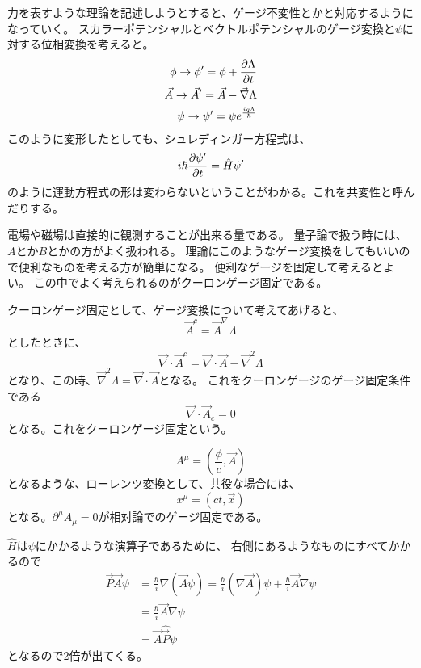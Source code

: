 \documentclass[titlepage]{ltjsarticle}
\begin{document}
力を表すような理論を記述しようとすると、ゲージ不変性とかと対応するようになっていく。
スカラーポテンシャルとベクトルポテンシャルのゲージ変換と\(\psi\)に対する位相変換を考えると。
\begin{align}
  \phi \to  \phi' = \phi + \pdv{\Lambda}{t}\\
  \vec{A} \to \vec{A}' = \vec{A} - \vec{\nabla} \Lambda\\
  \psi \to \psi' = \psi e^{\frac{i q \Lambda}{\hbar}}
\end{align}
このように変形したとしても、シュレディンガー方程式は、
\begin{equation}
  i \hbar \pdv{\psi'}{t} = \hat{H} \psi'
\end{equation}
のように運動方程式の形は変わらないということがわかる。これを共変性と呼んだりする。

電場や磁場は直接的に観測することが出来る量である。
量子論で扱う時には、\(A\)とか\(B\)とかの方がよく扱われる。
理論にこのようなゲージ変換をしてもいいので便利なものを考える方が簡単になる。
便利なゲージを固定して考えるとよい。
この中でよく考えられるのがクーロンゲージ固定である。

クーロンゲージ固定として、ゲージ変換について考えてあげると、
\begin{equation}
  \vec{A}^c = \vec{A} ^ \nabla \Lambda
\end{equation}
としたときに、
\begin{equation}
  \vec{\nabla} \cdot \vec{A}^c = \vec{\nabla} \cdot \vec{A} - \vec{\nabla}^2 \Lambda 
\end{equation}
となり、この時、\(\vec{\nabla}^2 \Lambda  = \vec{\nabla} \cdot \vec{A}\)となる。
これをクーロンゲージのゲージ固定条件である
\begin{equation}
  \vec{\nabla} \cdot \vec{A}_c = 0
\end{equation}
となる。これをクーロンゲージ固定という。

\begin{equation}
  A^\mu = \left(  \frac{\phi}{c}, \vec{A} \right)
\end{equation}
となるような、ローレンツ変換として、共役な場合には、
\begin{equation}
  x^\mu = \left( ct, \vec{x} \right)
\end{equation}
となる。\(\partial^\mu A_\mu=0\)が相対論でのゲージ固定である。

\(\hat{H}\)は\(\psi\)にかかるような演算子であるために、
右側にあるようなものにすべてかかるので
\begin{align}
  \vec{P} \vec{A} \psi & = \frac{\hbar}{i} \nabla (\vec{A} \psi) = \frac{\hbar}{i}(\nabla \vec{A}) \psi + \frac{\hbar}{i} \vec{A} \nabla \psi \\
  & = \frac{\hbar}{i} \vec{A} \nabla \psi \\
  & = \vec{A} \hat{\vec{P}} \psi
\end{align}
となるので2倍が出てくる。
\end{document}
